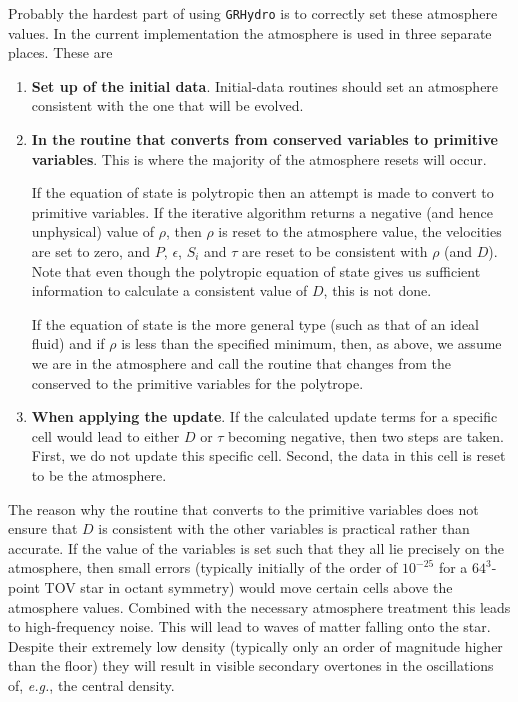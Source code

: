 \documentclass{article}
\begin{document}
Probably the hardest part of using {\tt GRHydro} is to correctly set these
atmosphere values. In the current implementation the atmosphere is
used in three separate places. These are
\begin{enumerate}
\item {\bf Set up of the initial data}. Initial-data routines should set an atmosphere consistent
  with the one that will be evolved.
\item {\bf In the routine that converts from conserved variables to
    primitive variables}. This is where the majority of the atmosphere
  resets will occur. 

  If the equation of state is polytropic then an
  attempt is made to convert to primitive variables. If the iterative
  algorithm returns a negative (and hence unphysical) value of $\rho$,
  then $\rho$ is reset to the atmosphere value, the velocities are set
  to zero, and $P$, $\epsilon$, $S_i$ and $\tau$ are reset to be
  consistent with $\rho$ (and $D$). Note that even though the
  polytropic equation of state gives us sufficient information to
  calculate a consistent value of $D$, this is not done.

  If the equation of state is the more general type (such as that of an ideal fluid) and if $\rho$
  is less than the specified minimum, then, as above, we assume we are in the atmosphere and call
  the routine that changes from the conserved to the primitive variables for the polytrope.

\item {\bf When applying the update}. If the calculated update terms
  for a specific cell would lead to either $D$ or $\tau$ becoming
  negative, then two steps are taken. First, we do not update this
  specific cell. Second, the data in this cell is reset to be the
  atmosphere. 
\end{enumerate}

The reason why the routine that converts to the primitive variables
does not ensure that $D$ is consistent with the other variables is
practical rather than accurate. If the value of the variables is set
such that they all lie precisely on the atmosphere, then small errors
(typically initially of the order of $10^{-25}$ for a $64^3$-point TOV star
in octant symmetry) would move certain cells above the atmosphere
values. Combined with the necessary atmosphere treatment this leads to
high-frequency noise. This will lead to waves of matter falling onto
the star. Despite their extremely low density (typically only an
order of magnitude higher than the floor) they will result in visible
secondary overtones in the oscillations of, {\it e.g.}, the central
density. 
\end{document}
